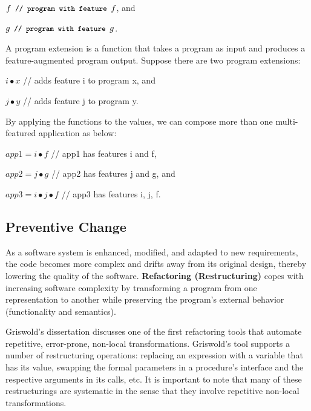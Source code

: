 \documentclass[runningheads,a4paper]{llncs}
\newcommand{\text}[1]{\footnotesize{\texttt{#1}}\normalsize}
\begin{document}
$f \text{	// program with feature }f$, and

$g\text{	// program with feature }g$.

\noindent
A program extension is a function that takes a program as input and produces a feature-augmented program output. Suppose there are two program extensions:

$i \bullet x$ // adds feature i to program x, and 

$j \bullet y$ // adds feature j to program y.

By applying the functions to the values, we can compose more than one multi-featured application as below:

$app1 = i \bullet f$ // app1 has features i and f,

$app2 = j \bullet g$ // app2 has features j and g, and
 
$app3 = i \bullet j \bullet f$ // app3 has features i, j, f.

 
 

\subsection{Preventive Change}
\label{sec:preventive}

As a software system is enhanced, modified, and adapted to new requirements, the code becomes more complex and drifts away from its original design, thereby lowering the quality of the software. {\bf Refactoring (Restructuring)} \cite{Fowler2000, Griswold1991, Opdyke1992, Mens2004} copes with increasing software complexity by transforming a program from one representation to another while preserving the program's external behavior (functionality and semantics).%

Griswold's dissertation \cite{Griswold1991} discusses one of the first refactoring tools that automate repetitive, error-prone, non-local transformations. Griswold's tool supports a number of restructuring operations: replacing an expression with a variable that has its value, swapping the formal parameters in a procedure's interface and the respective arguments in its calls, etc. It is important to note that many of these restructurings are systematic in the sense that they involve repetitive non-local transformations. 
\end{document}
